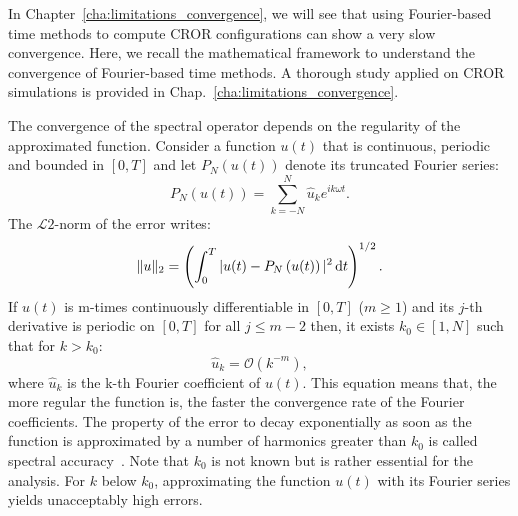 
In Chapter~\ref{cha:limitations_convergence}, we will
see that using Fourier-based time methods to compute
CROR configurations can show a very slow convergence. Here,
we recall the mathematical framework to understand the convergence
of Fourier-based time methods. A thorough study applied on CROR
simulations is provided in Chap.~\ref{cha:limitations_convergence}.

The convergence of the spectral operator depends on
the regularity of the approximated function. Consider a function
$u(t)$ that is continuous, periodic and bounded in $[0,T]$
and let $P_N \left(u(t)\right)$ denote its truncated Fourier series:
\begin{equation}
    P_N \left(u(t)\right) = \sum_{k=-N}^{N} \widehat{u}_k e^{i k\omega t}.
\end{equation}
The $\mathcal{L}2$-norm of the error writes:
\begin{equation}
   \| u \|_2 = \left(\int_0^T |u(t) - P_N \left(u(t)\right)|^2 \mathop{}\!\mathrm{d} t \right)^{1/2}.
\end{equation}
If $u(t)$ is m-times continuously differentiable in $[0,T]$ ($m \geq 1$) 
and its $j$-th derivative is periodic on $[0,T]$ for all $j \leq m - 2$
then, it exists  $k_0 \in [1, N]$ such that for $k > k_0$:
\begin{equation}
    \widehat{u}_k = \mathcal{O} (k^{-m}),
\end{equation}
where $\widehat{u}_k$ is the k-th Fourier coefficient of $u(t)$.
This equation means that, the more regular the function is,
the faster the convergence rate of the Fourier
coefficients.
The property of the error to decay exponentially as soon as 
the function is approximated by a number of harmonics greater than $k_0$ 
is called spectral accuracy~\cite{Canuto2006}. Note that
$k_0$ is not known but is rather essential for the analysis.
For $k$ below $k_0$, approximating the function $u(t)$ with its Fourier
series yields unacceptably high errors.